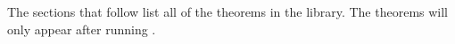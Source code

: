 The sections that follow list all of the theorems in the
 library.  The  theorems will
only appear after running .
